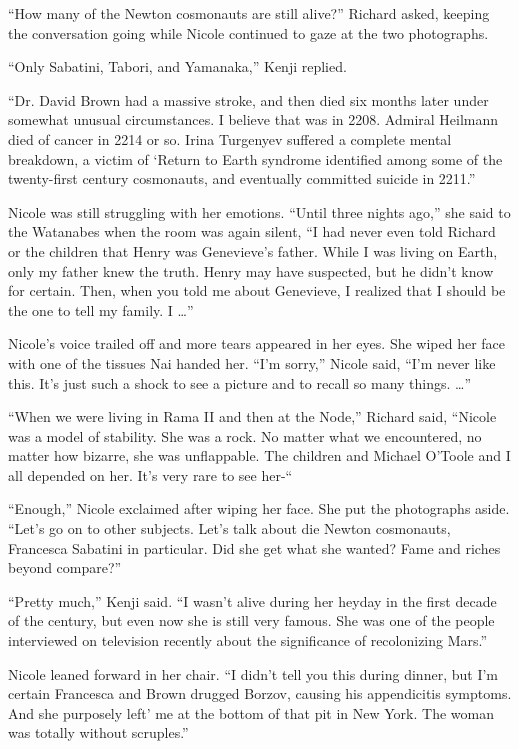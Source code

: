 \documentclass[]{article}
\begin{document}
{“How many of the Newton cosmonauts are still alive?” Richard asked, keeping the conversation going while Nicole continued to gaze at the two photographs.

“Only Sabatini, Tabori, and Yamanaka,” Kenji replied.

“Dr.  David Brown had a massive stroke, and then died six months later under somewhat unusual circumstances.  I believe that was in 2208.  Admiral Heilmann died of cancer in 2214 or so.  Irina Turgenyev suffered a complete mental breakdown, a victim of ‘Return to Earth syndrome identified among some of the twenty-first century cosmonauts, and eventually committed suicide in 2211.”

Nicole was still struggling with her emotions.  “Until three nights ago,” she said to the Watanabes when the room was again silent, “I had never even told Richard or the children that Henry was Genevieve’s father.  While I was living on Earth, only my father knew the truth.  Henry may have suspected, but he didn’t know for certain.  Then, when you told me about Genevieve, I realized that I should be the one to tell my family.  I …”

Nicole’s voice trailed off and more tears appeared in her eyes.  She wiped her face with one of the tissues Nai handed her.  “I’m sorry,” Nicole said, “I’m never like this.  It’s just such a shock to see a picture and to recall so many things.  …”

“When we were living in Rama II and then at the Node,” Richard said, “Nicole was a model of stability.  She was a rock.  No matter what we encountered, no matter how bizarre, she was unflappable.  The children and Michael O’Toole and I all depended on her.  It’s very rare to see her-“

“Enough,” Nicole exclaimed after wiping her face.  She put the photographs aside.  “Let’s go on to other subjects.  Let’s talk about die Newton cosmonauts, Francesca Sabatini in particular.  Did she get what she wanted? Fame and riches beyond compare?”

“Pretty much,” Kenji said.  “I wasn’t alive during her heyday in the first decade of the century, but even now she is still very famous.  She was one of the people interviewed on television recently about the significance of recolonizing Mars.”

Nicole leaned forward in her chair.  “I didn’t tell you this during dinner, but I’m certain Francesca and Brown drugged Borzov, causing his appendicitis symptoms.  And she purposely left’ me at the bottom of that pit in New York.  The woman was totally without scruples.”

}
\end{document}
